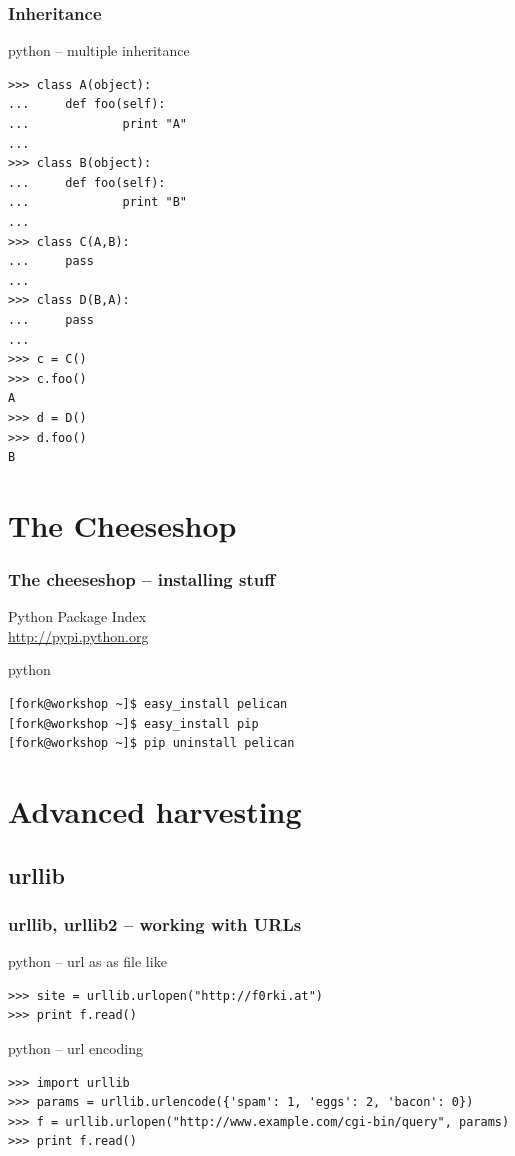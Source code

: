 \documentclass{beamer}
\begin{document}
\begin{frame}[fragile]
	\frametitle{Inheritance}
	\begin{exampleblock}{python -- multiple inheritance}
	\begin{lstlisting}
>>> class A(object):
...     def foo(self):
...             print "A"
...
>>> class B(object):
...     def foo(self):
...             print "B"
...
>>> class C(A,B):
...     pass
...
>>> class D(B,A):
...     pass
...
>>> c = C()
>>> c.foo()
A
>>> d = D()
>>> d.foo()
B	
	\end{lstlisting}
	\end{exampleblock}
\end{frame}

\section{The Cheeseshop}	%

\begin{frame}[fragile]
	\frametitle{The cheeseshop -- installing stuff}
	Python Package Index\\
	\url{http://pypi.python.org}
	\begin{exampleblock}{python}
	\begin{lstlisting}[language=bash]
[fork@workshop ~]$ easy_install pelican
[fork@workshop ~]$ easy_install pip
[fork@workshop ~]$ pip uninstall pelican
	\end{lstlisting}
	\end{exampleblock}
\end{frame}

\section{Advanced harvesting}


\subsection*{urllib}	%
\begin{frame}[fragile]
	\frametitle{urllib, urllib2 -- working with URLs}
	\begin{exampleblock}{python -- url as as file like}
	\begin{lstlisting}
>>> site = urllib.urlopen("http://f0rki.at")
>>> print f.read()
	\end{lstlisting}
	\end{exampleblock}
\pause	
	\begin{exampleblock}{python -- url encoding}
	\begin{lstlisting}
>>> import urllib
>>> params = urllib.urlencode({'spam': 1, 'eggs': 2, 'bacon': 0})
>>> f = urllib.urlopen("http://www.example.com/cgi-bin/query", params)
>>> print f.read()
	\end{lstlisting}
	\end{exampleblock}
\end{frame}
\end{document}
